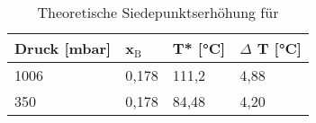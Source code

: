 	\begin{table}[H]
		\caption{Theoretische Siedepunktserhöhung für }
		\label{tab:Siedepunkt_CaCl2}
			\begin{tabular}{|l|l|l|l|}
			\hline
			\textbf{Druck [mbar]}	&	\textbf{x$_\text{B}$}	&	\textbf{T* [°C]} & \textbf{$\Delta$ T [°C]} \\\hline
			1006	&	0,178	&	111,2	&	4,88 \\
			350		&	0,178	&	84,48	&	4,20 \\\hline
			\end{tabular}
	\end{table} 		

	